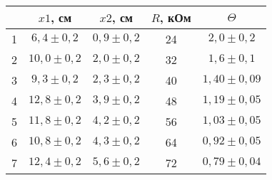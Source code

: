 \begin{tabular}{ccccc}
\toprule
 & $x1$, см & $x2$, см & $R$, кОм & $\Theta$ \\
\midrule
1 & $6,4 \pm 0,2$ & $0,9 \pm 0,2$ & 24 & $2,0 \pm 0,2$ \\
2 & $10,0 \pm 0,2$ & $2,0 \pm 0,2$ & 32 & $1,6 \pm 0,1$ \\
3 & $9,3 \pm 0,2$ & $2,3 \pm 0,2$ & 40 & $1,40 \pm 0,09$ \\
4 & $12,8 \pm 0,2$ & $3,9 \pm 0,2$ & 48 & $1,19 \pm 0,05$ \\
5 & $11,8 \pm 0,2$ & $4,2 \pm 0,2$ & 56 & $1,03 \pm 0,05$ \\
6 & $10,8 \pm 0,2$ & $4,3 \pm 0,2$ & 64 & $0,92 \pm 0,05$ \\
7 & $12,4 \pm 0,2$ & $5,6 \pm 0,2$ & 72 & $0,79 \pm 0,04$ \\
\bottomrule
\end{tabular}